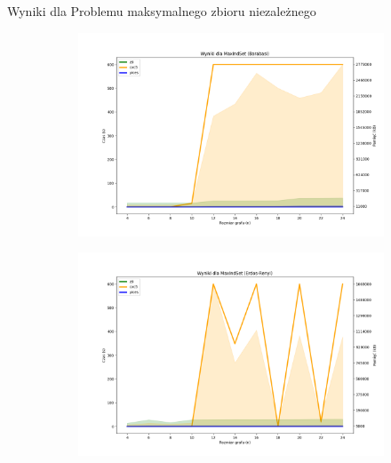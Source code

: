 \begin{frame}{Wyniki dla Problemu maksymalnego zbioru niezależnego}
	\begin{figure}[htbp]
		\centering
		\begin{subfigure}[b]{0.5\textwidth}
			\includegraphics[width=\textwidth]{../thesis/figures/4-barabasi-plot.png}
		\end{subfigure}
		\begin{subfigure}[b]{0.49\textwidth}
			\includegraphics[width=\textwidth]{../thesis/figures/4-erdos-renyi-plot.png}
		\end{subfigure}
	\end{figure}
\end{frame}
	